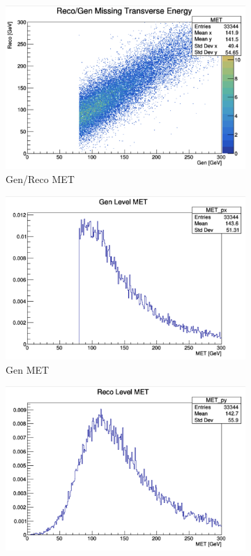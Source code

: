 \documentclass{article}
\begin{document}
\begin{figure}
\begin{subfigure}[b]{.3\textwidth}
  \centering
  \includegraphics[width=\textwidth]{MET2D.png}  
  \caption{Gen/Reco MET}
  \label{fig:sub-first2D}
\end{subfigure}
\begin{subfigure}[b]{.3\textwidth}
  \centering
  \includegraphics[width=\textwidth]{METGen.png}  
  \caption{Gen MET}
  \label{fig:sub-thirdgen}
\end{subfigure}
\begin{subfigure}[b]{.3\textwidth}
  \centering
  \includegraphics[width=\textwidth]{METReco.png}  

\end{subfigure}
\end{figure}
\end{document}
